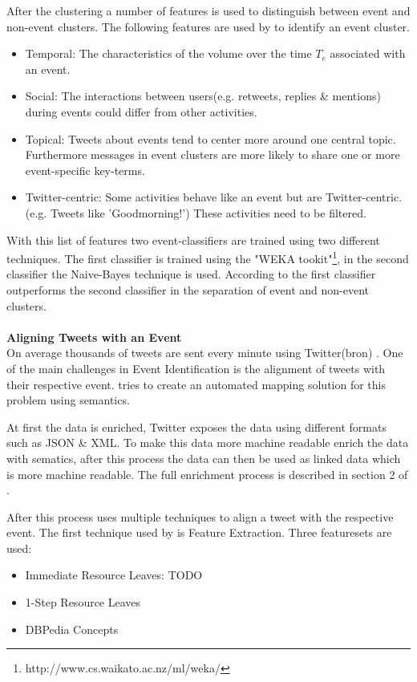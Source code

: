 \documentclass{article}
\begin{document}
After the clustering a number of features is used to distinguish between event and non-event clusters. The following features are used by \cite{eventident} to identify an event cluster. 
\begin{itemize}
  \item Temporal: The characteristics of the volume over the time $T_e$ associated with an event. 
  \item Social: The interactions between users(e.g. retweets, replies \& mentions) during events could differ from other activities. 
  \item Topical: Tweets about events tend to center more around one central topic. Furthermore messages in event clusters are more likely to share one or more event-specific key-terms.  
  \item Twitter-centric: Some activities behave like an event but are Twitter-centric.(e.g. Tweets like 'Goodmorning!') These activities need to be filtered. 
\end{itemize}

With this list of features two event-classifiers are trained using two different techniques. The first classifier is trained using the "WEKA tookit"\footnote{http://www.cs.waikato.ac.nz/ml/weka/}, in the second classifier the  Naive-Bayes technique is used. According to \cite{eventident} the first classifier outperforms the second classifier in the separation of event and non-event clusters. 
\\\\
\textbf{Aligning Tweets with an Event} \\
On average thousands of tweets are sent every minute using Twitter(bron) . One of the main challenges in Event Identification is the alignment of tweets with their respective event. \cite{eventalign} tries to create an automated mapping solution for this problem using semantics.

At first the data is enriched, Twitter exposes the data using different formats such as JSON \& XML. To make this data more machine readable \cite{eventalign} enrich the data with sematics, after this process the data can then  be used as linked data which is more machine readable. The full enrichment process is described in section 2 of \cite{eventalign}.

After this process \cite{eventalign} uses multiple techniques to align a tweet with the respective event. The first technique used by \cite{eventalign} is Feature Extraction. Three featuresets are used:
\begin{itemize}
  \item Immediate Resource Leaves: TODO
  \item 1-Step Resource Leaves 
  \item DBPedia Concepts 
\end{itemize}
\end{document}
